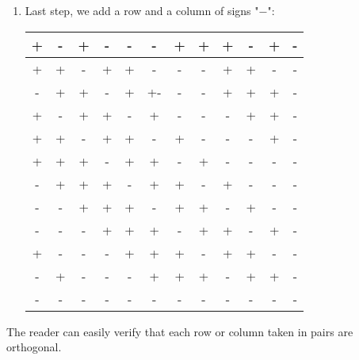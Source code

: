 \begin{enumerate}
\begin{table}[H]
\begin{center}
\begin{tabular}{|c|c|c|c|c|c|c|c|c|c|c|c|}
			\hline 
			+ & + & - & + & + & - & + & - & - & - & + & {} \\ 
			\hline 
			+ & + & + & - & + & + & - & + & - & - & - & {} \\ 
			\hline 
			- & + & + & + & - & + & + & - & + & - & - & {} \\ 
			\hline 
			- & - & + & + & + & - & + & + & - & + & - & {} \\ 
			\hline 
			- & - & - & + & + & + & - & + & + & - & + & {} \\ 
			\hline 
			+ & - & - & - & + & + & + & - & + & + & - & {} \\ 
			\hline 
			- & + & - & - & - & + & + & + & - & + & + & {} \\ 
			\hline 
			{} & {} & {} & {} & {} & {} & {} & {} & {} & {} & {} & {} \\ 
			\hline 
			\end{tabular}
		\end{center}
		\end{table}
		
		\item Last step, we add a row and a column of signs "$-$":
		\begin{table}[H]
		\begin{center}
			\begin{tabular}{|c|c|c|c|c|c|c|c|c|c|c|c|}
			\hline 
			+ & - & + & - & - & - & + & + & + & - & + & - \\ 
			\hline 
			+ & + & - & + & + & - & - & - & + & + & - & - \\ 
			\hline 
			- & + & + & - & + & +-& - & - & + & + & + & - \\ 
			\hline 
			+ & - & + & + & - & + & - & - & - & + & + & - \\ 
			\hline 
			+ & + & - & + & + & - & + & - & - & - & + & - \\ 
			\hline 
			+ & + & + & - & + & + & - & + & - & - & - & - \\ 
			\hline 
			- & + & + & + & - & + & + & - & + & - & - & - \\ 
			\hline 
			- & - & + & + & + & - & + & + & - & + & - & - \\ 
			\hline 
			- & - & - & + & + & + & - & + & + & - & + & - \\ 
			\hline 
			+ & - & - & - & + & + & + & - & + & + & - & - \\ 
			\hline 
			- & + & - & - & - & + & + & + & - & + & + & - \\ 
			\hline 
			- & - & - & - & - & - & - & - & - & - & - & - \\ 
			\hline 
			\end{tabular}
		\end{center}
		\end{table}
	\end{enumerate}
	The reader can easily verify that each row or column taken in pairs are orthogonal.
	
